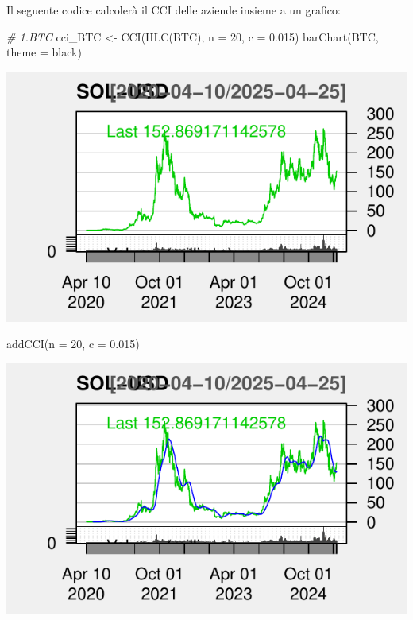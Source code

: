 \documentclass[]{tufte-handout}
\newenvironment{Shaded}{}{}
\newcommand{\AttributeTok}[1]{\textcolor[rgb]{0.49,0.56,0.16}{#1}}
\newcommand{\CommentTok}[1]{\textcolor[rgb]{0.38,0.63,0.69}{\textit{#1}}}
\newcommand{\DecValTok}[1]{\textcolor[rgb]{0.25,0.63,0.44}{#1}}
\newcommand{\FloatTok}[1]{\textcolor[rgb]{0.25,0.63,0.44}{#1}}
\newcommand{\FunctionTok}[1]{\textcolor[rgb]{0.02,0.16,0.49}{#1}}
\newcommand{\NormalTok}[1]{#1}
\newcommand{\OtherTok}[1]{\textcolor[rgb]{0.00,0.44,0.13}{#1}}
\newcommand{\StringTok}[1]{\textcolor[rgb]{0.25,0.44,0.63}{#1}}
\begin{document}
Il seguente codice calcolerà il CCI delle aziende insieme a un grafico:

\begin{Shaded}
\begin{Highlighting}[]
\CommentTok{\# 1.BTC }
\NormalTok{cci\_BTC }\OtherTok{\textless{}{-}} \FunctionTok{CCI}\NormalTok{(}\FunctionTok{HLC}\NormalTok{(BTC), }\AttributeTok{n =} \DecValTok{20}\NormalTok{, }\AttributeTok{c =} \FloatTok{0.015}\NormalTok{)}
\FunctionTok{barChart}\NormalTok{(BTC, }\AttributeTok{theme =} \StringTok{\textquotesingle{}black\textquotesingle{}}\NormalTok{)}
\end{Highlighting}
\end{Shaded}

\includegraphics{cripto_update_files/figure-latex/unnamed-chunk-10-1}

\begin{Shaded}
\begin{Highlighting}[]
\FunctionTok{addCCI}\NormalTok{(}\AttributeTok{n =} \DecValTok{20}\NormalTok{, }\AttributeTok{c =} \FloatTok{0.015}\NormalTok{)}
\end{Highlighting}
\end{Shaded}

\includegraphics{cripto_update_files/figure-latex/unnamed-chunk-10-2}
\end{document}
